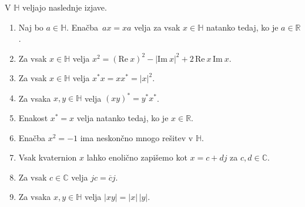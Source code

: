 \documentclass[mat1, tisk]{fmfdelo}
\numberwithin{equation}{section}
\begin{document}
\begin{trditev}\label{eq1}
    V $\mathbb{H}$ veljajo naslednje izjave.
    \begin{enumerate}
        \item Naj bo $a \in \mathbb{H}$. Enačba $\, ax = xa$ velja za vsak $x \in \mathbb{H}$ natanko tedaj, ko je $a \in \mathbb{R}$.
        \item Za vsak $x \in \mathbb{H}$ velja $x^2 = {(\mathrm{Re} \: x)}^2 - {|\mathrm{Im} \: x|}^2 + 2 \, \mathrm{Re} \: x \, \mathrm{Im} \: x$. 
        \item Za vsak $x \in \mathbb{H}$ velja $x^{*} x = x x^{*} = {|x|}^2$.
        \item Za vsaka $x, y \in \mathbb{H}$ velja $(xy)^{*} = {y}^{*} {x}^{*}$.
        \item Enakost $x^{*} = x$ velja natanko tedaj, ko je $x \in \mathbb{R}$.
        \item Enačba $x^2 = -1$ ima neskončno mnogo rešitev v $\mathbb{H}$.
        \item Vsak kvaternion $x$ lahko enolično zapišemo kot $x = c+ dj$ za $c, d \in \mathbb{C}$.
        \item Za vsak $c \in \mathbb{C}$ velja $j c = \overline{c} j$.
        \item Za vsaka $x, y \in \mathbb{H}$ velja $|xy| = |x| \, |y|$.
    \end{enumerate}
\end{trditev}
\end{document}
